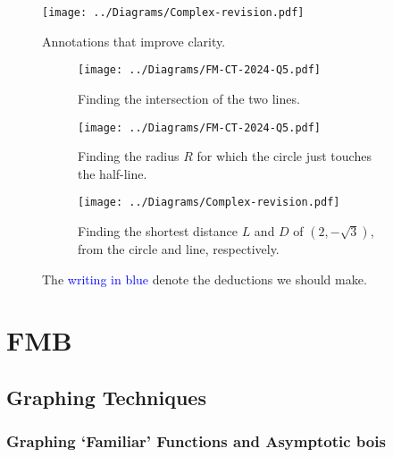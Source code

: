 \documentclass[oneside]{book}
\begin{document}
\begin{example}{}{}
  \begin{figure}[H]
    \centering
    \texttt{[image: ../Diagrams/Complex-revision.pdf]}
    \caption{\textcolor{green!85!black}{Annotations} that improve clarity.}
    \label{fig:complex-clarity-improvements}
  \end{figure}
  \begin{figure}[H]
    \centering
    \begin{subfigure}[c]{0.45\textwidth}
      \centering
      \texttt{[image: ../Diagrams/FM-CT-2024-Q5.pdf]}
      \caption{Finding the intersection of the two lines.}
  \end{subfigure}\hfill
  \begin{subfigure}[c]{0.45\textwidth}
      \centering
      \texttt{[image: ../Diagrams/FM-CT-2024-Q5.pdf]}
      \caption{Finding the radius \(R\) for which the circle just touches the half-line.}
  \end{subfigure}

  \begin{subfigure}[c]{0.45\textwidth}
    \centering
    \texttt{[image: ../Diagrams/Complex-revision.pdf]}
    \caption{Finding the shortest distance \(L\) and \(D\) of \((2,-\sqrt{3})\), from the circle and line, respectively.}
  \end{subfigure}
    \caption{The \textcolor{blue}{writing in blue} denote the deductions we should make.}
    \label{fig:RVFM-CT-2024-Complex}
  \end{figure}
\end{example}


\part{FMB}
\chapter{Graphing Techniques}
\section{Graphing `Familiar' Functions and Asymptotic bois}
\end{document}
